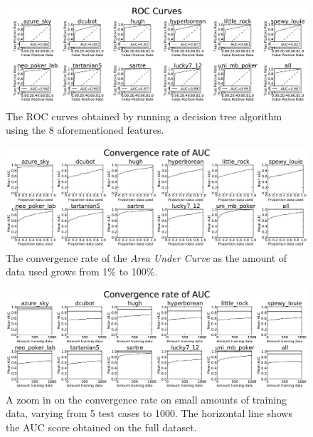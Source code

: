 \documentclass[letterpaper]{article}
\begin{document}
\onecolumn
\begin{figure}[H]
    \centering
    \includegraphics[width=\textwidth,natwidth=610,natheight=642]{rocNorm8BW.jpg}
    \caption{The ROC curves obtained by running a decision tree algorithm using the 8 aforementioned features.}
\end{figure}
\begin{figure}[H]
    \centering
    \includegraphics[width=\textwidth,natwidth=610,natheight=642]{convergence8BW.jpg}
    \caption{The convergence rate of the \emph{Area Under Curve} as the amount of data used grows from 1\% to 100\%.}
\end{figure}
\begin{figure}[H]
    \centering
    \includegraphics[width=\textwidth,natwidth=610,natheight=642]{smallConv8BW.jpg}
    \caption{A zoom in on the convergence rate on small amounts of training data, varying from 5 test cases to 1000. The horizontal line shows the AUC score obtained on the full dataset.}
\end{figure}
\twocolumn
\end{document}
